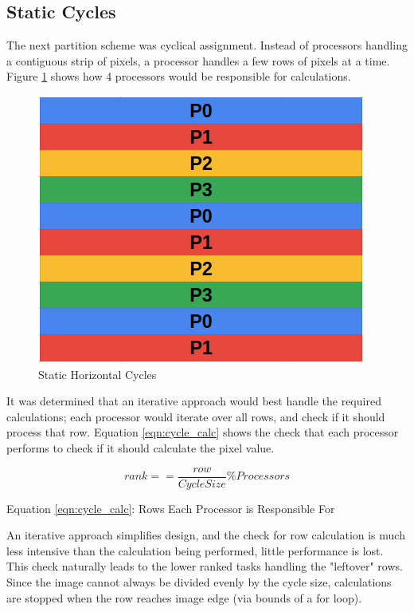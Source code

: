 \documentclass[11pt]{article}
\begin{document}
	\subsection{Static Cycles}
	
		The next partition scheme was cyclical assignment. Instead of processors handling a contiguous strip of pixels, a processor handles a few rows of pixels at a time. Figure \ref{fig:cycles} shows how 4 processors would be responsible for calculations. 
		
		\begin{figure}[H]
			\centering
			\includegraphics[width=0.7\linewidth]{Pictures/Cycles}
			\caption{Static Horizontal Cycles}
			\label{fig:cycles}
		\end{figure}
	
		It was determined that an iterative approach would best handle the required calculations; each processor would iterate over all rows, and check if it should process that row. Equation \ref{eqn:cycle_calc} shows the check that each processor performs to check if it should calculate the pixel value.
	
		\begin{equation}\label{eqn:cycle_calc}
		rank == \frac{row}{CycleSize} \% Processors
		\end{equation}
		\begin{center}
			Equation \ref{eqn:cycle_calc}: Rows Each Processor is Responsible For
		\end{center}
	
		An iterative approach simplifies design, and the check for row calculation is much less intensive than the calculation being performed, little performance is lost. This check naturally leads to the lower ranked tasks handling the "leftover" rows. Since the image cannot always be divided evenly by the cycle size, calculations are stopped when the row reaches image edge (via bounds of a for loop).
		
\end{document}
